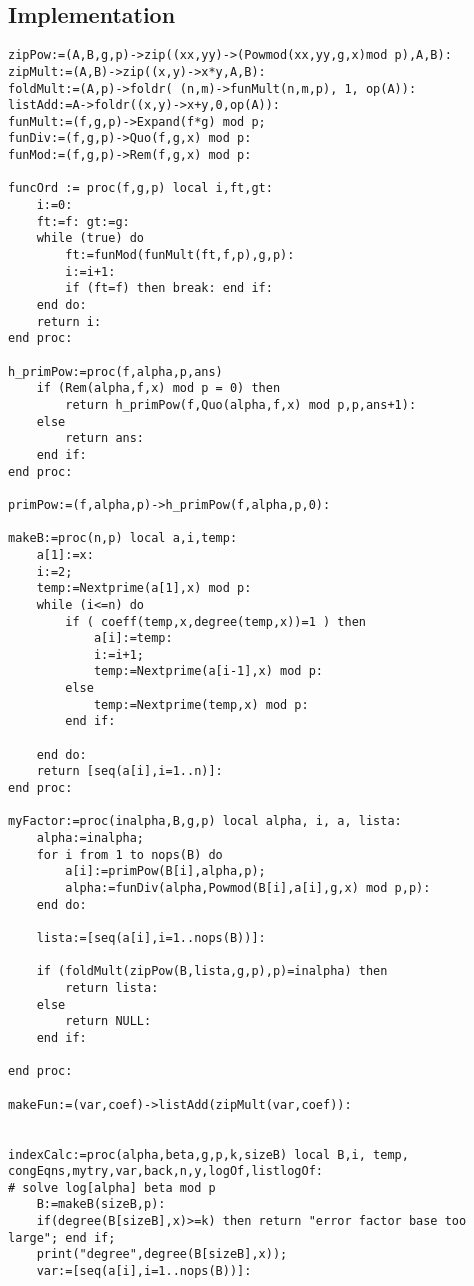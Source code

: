 \documentclass[article,oneside]{memoir}
\begin{document}
\subsection*{Implementation}
\begin{verbatim}
zipPow:=(A,B,g,p)->zip((xx,yy)->(Powmod(xx,yy,g,x)mod p),A,B):
zipMult:=(A,B)->zip((x,y)->x*y,A,B):
foldMult:=(A,p)->foldr( (n,m)->funMult(n,m,p), 1, op(A)):
listAdd:=A->foldr((x,y)->x+y,0,op(A)):
funMult:=(f,g,p)->Expand(f*g) mod p;
funDiv:=(f,g,p)->Quo(f,g,x) mod p:
funMod:=(f,g,p)->Rem(f,g,x) mod p:

funcOrd := proc(f,g,p) local i,ft,gt:
    i:=0:
    ft:=f: gt:=g:
    while (true) do
        ft:=funMod(funMult(ft,f,p),g,p):
        i:=i+1:
        if (ft=f) then break: end if:
    end do:
    return i:
end proc:

h_primPow:=proc(f,alpha,p,ans)
	if (Rem(alpha,f,x) mod p = 0) then
		return h_primPow(f,Quo(alpha,f,x) mod p,p,ans+1):
	else
		return ans:
	end if:
end proc:

primPow:=(f,alpha,p)->h_primPow(f,alpha,p,0):

makeB:=proc(n,p) local a,i,temp:
    a[1]:=x:
    i:=2;
    temp:=Nextprime(a[1],x) mod p:
    while (i<=n) do
        if ( coeff(temp,x,degree(temp,x))=1 ) then
            a[i]:=temp:
            i:=i+1;
            temp:=Nextprime(a[i-1],x) mod p:            
        else
            temp:=Nextprime(temp,x) mod p:
        end if:
        
    end do:
    return [seq(a[i],i=1..n)]:
end proc:

myFactor:=proc(inalpha,B,g,p) local alpha, i, a, lista:
    alpha:=inalpha;
    for i from 1 to nops(B) do 
        a[i]:=primPow(B[i],alpha,p);
        alpha:=funDiv(alpha,Powmod(B[i],a[i],g,x) mod p,p):
    end do:
    
  	lista:=[seq(a[i],i=1..nops(B))]:

  	if (foldMult(zipPow(B,lista,g,p),p)=inalpha) then
        return lista:
    else 
        return NULL:
    end if:

end proc:

makeFun:=(var,coef)->listAdd(zipMult(var,coef)):


indexCalc:=proc(alpha,beta,g,p,k,sizeB) local B,i, temp, congEqns,mytry,var,back,n,y,logOf,listlogOf:
# solve log[alpha] beta mod p
    B:=makeB(sizeB,p):
    if(degree(B[sizeB],x)>=k) then return "error factor base too large"; end if;
    print("degree",degree(B[sizeB],x));
    var:=[seq(a[i],i=1..nops(B))]:


\end{verbatim}
\end{document}
